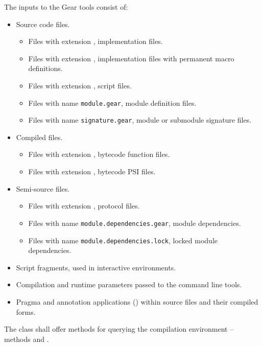 The inputs to the Gear tools consist of: 
\begin{itemize}
  \item Source code files. 
    \begin{itemize}
      \item Files with extension , implementation files. 
      \item Files with extension , implementation files with permanent macro definitions. 
      \item Files with extension , script files. 
      \item Files with name \lstinline[deletekeywords={module}]!module.gear!, module definition files. 
      \item Files with name \lstinline[deletekeywords={signature}]!signature.gear!, module or submodule signature files. 
    \end{itemize}
  \item Compiled files. 
    \begin{itemize}
      \item Files with extension , bytecode function files. 
      \item Files with extension , bytecode PSI files. 
    \end{itemize}
  \item Semi-source files. 
    \begin{itemize}
      \item Files with extension , protocol files. 
      \item Files with name \lstinline[deletekeywords={module}]!module.dependencies.gear!, module dependencies. 
      \item Files with name \lstinline[deletekeywords={module}]!module.dependencies.lock!, locked module dependencies. 
    \end{itemize}
  \item Script fragments, used in interactive environments. 
  \item Compilation and runtime parameters passed to the command line tools. 
  \item Pragma and annotation applications () within source files and their compiled forms. 
\end{itemize}

The  class shall offer methods for querying the compilation environment -- methods  and .


